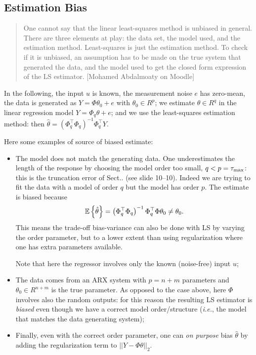 \subsection{Estimation Bias}
\label{sec:estimation-bias}

\begin{quotation}
  One cannot say that the linear least-squares method is unbiased in general. There are three elements at play: the data set, the model used, and the estimation method. Least-squares is just the estimation method. To check if it is unbiased, an assumption has to be made on the true system that generated the data, and the model used to get the closed form expression of the LS estimator. [Mohamed Abdalmoaty on Moodle]
\end{quotation}

In the following, the input $u$ is known, the measurement noise $e$ has zero-mean, the data is generated as $Y=\Phi\theta_0+e$ with $\theta_0\in R^p$; we estimate $\theta\in R^q$ in the linear regression model $Y=\Phi_q\theta+e$; and we use the least-squares estimation method: then $\hat{\theta} = \left(\Phi_q^\top \Phi_q\right)^{-1} \Phi_q^\top Y$.

Here some examples of source of biased estimate:
\begin{itemize}
\item The model does not match the generating data. One underestimates the length of the response by choosing the model order too small, $q<p=\tau_\text{max}$: this is the truncation error of Sect.. (see slide 10--10). Indeed we are trying to fit the data with a model of order $q$ but the model has order $p$. The estimate is biased because
  \begin{equation*}
    \mathbb{E}\left\{\hat{\theta}\right\} = \left(\Phi_q^\top \Phi_q\right)^{-1}\Phi_q^\top\Phi \theta_0 \neq \theta_0.
  \end{equation*}
  This means the trade-off bias-variance can also be done with LS by varying the order parameter, but to a lower extent than using regularization where one has extra parameters available.

  Note that here the regressor involves only the known (noise-free) input $u$;
\item The data comes from an ARX system with $p=n+m$ parameters and $\theta_0\in R^{n+m}$ is the true parameter. As opposed to the case above, here $\Phi$ involves also the random outputs: for this reason the resulting LS estimator is \emph{biased} even though we have a correct model order/structure (\textit{i.e.}, the model that matches the data generating system);
\item Finally, even with the correct order parameter, one can \emph{on purpose} bias $\hat{\theta}$ by adding the regularization term to $||Y-\Phi\theta||_2$.
\end{itemize}

